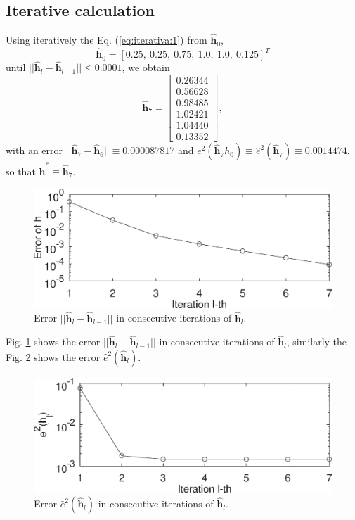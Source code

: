\documentclass[11pt,twocolumn]{article}
\begin{document}
\subsection{Iterative calculation}

Using iteratively the Eq. (\ref{eq:iterativa:1}) from $\mathbf{\hat{h}}_0$,
\begin{equation}\label{eq:iterativa:h:0}
\mathbf{\hat{h}}_0=\left[0.25,~0.25,~0.75,~1.0,~1.0,~0.125\right]^{T}
\end{equation}
until $||\mathbf{\hat{h}}_{l}-\mathbf{\hat{h}}_{l-1}||\leq 0.0001$,
we obtain 
\begin{equation}\label{eq:iterativa:h:7}
\mathbf{\hat{h}}_7 = \left[
\begin{matrix}
0.26344\\
0.56628\\
0.98485\\
1.02421\\
1.04440\\ 
0.13352
\end{matrix}
\right],
\end{equation}
with an error $||\mathbf{\hat{h}}_{7}-\mathbf{\hat{h}}_{6}||\equiv 0.000087817$ 
and $e^2(\mathbf{\hat{h}}_{7} h_0)\equiv \hat{e}^2(\mathbf{\hat{h}}_{7} )\equiv 0.0014474$, 
so that $\mathbf{\hat{h}^*} \equiv \mathbf{\hat{h}}_7 $.

\begin{figure}[ht!]
\centering
\includegraphics[width=0.950\columnwidth]{errorh.eps}
\caption{Error $||\mathbf{\hat{h}}_{l}-\mathbf{\hat{h}}_{l-1}||$ in consecutive iterations of $\mathbf{\hat{h}}_{l}$.}
\label{fig:errorh}
\end{figure}

Fig. \ref{fig:errorh} shows the error  $||\mathbf{\hat{h}}_{l}-\mathbf{\hat{h}}_{l-1}||$ in consecutive iterations of $\mathbf{\hat{h}}_{l}$,
similarly the Fig. \ref{fig:error} shows the error  $\hat{e}^2(\mathbf{\hat{h}}_{l} )$.


\begin{figure}[ht!]
\centering
\includegraphics[width=0.950\columnwidth]{error.eps}
\caption{Error $\hat{e}^2(\mathbf{\hat{h}}_{l})$ in consecutive iterations of $\mathbf{\hat{h}}_{l}$.}
\label{fig:error}
\end{figure}
\end{document}

